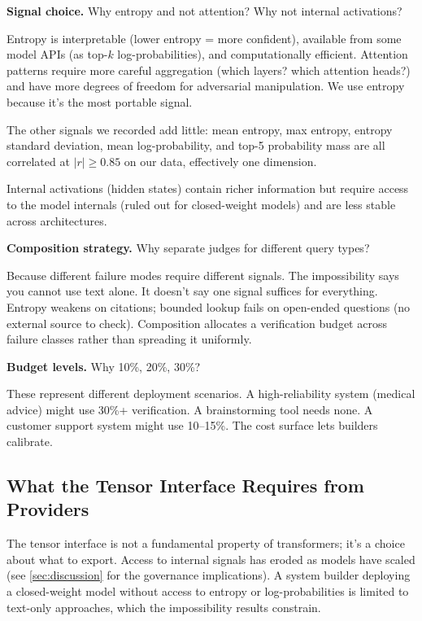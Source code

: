 \documentclass[11pt]{article}
\newcommand{\fakepara}[1]{\noindent\textbf{#1}\xspace}
\begin{document}
\fakepara{Signal choice.} Why entropy and not attention? Why not internal activations?

Entropy is interpretable (lower entropy = more confident), available from some model APIs (as top-$k$ log-probabilities), and computationally efficient. Attention patterns require more careful aggregation (which layers? which attention heads?) and have more degrees of freedom for adversarial manipulation. We use entropy because it's the most portable signal.

The other signals we recorded add little: mean entropy, max entropy, entropy standard deviation, mean log-probability, and top-5 probability mass are all correlated at $|r| \geq 0.85$ on our data, effectively one dimension.

Internal activations (hidden states) contain richer information but require access to the model internals (ruled out for closed-weight models) and are less stable across architectures.

\fakepara{Composition strategy.} Why separate judges for different query types?

Because different failure modes require different signals. The impossibility says you cannot use text alone. It doesn't say one signal suffices for everything. Entropy weakens on citations; bounded lookup fails on open-ended questions (no external source to check). Composition allocates a verification budget across failure classes rather than spreading it uniformly.

\fakepara{Budget levels.} Why 10\%, 20\%, 30\%?

These represent different deployment scenarios. A high-reliability system (medical advice) might use 30\%+ verification. A brainstorming tool needs none. A customer support system might use 10--15\%. The cost surface lets builders calibrate.

\subsection{What the Tensor Interface Requires from Providers}

The tensor interface is not a fundamental property of transformers; it's a choice about what to export. Access to internal signals has eroded as models have scaled (see \autoref{sec:discussion} for the governance implications). A system builder deploying a closed-weight model without access to entropy or log-probabilities is limited to text-only approaches, which the impossibility results constrain.
\end{document}
